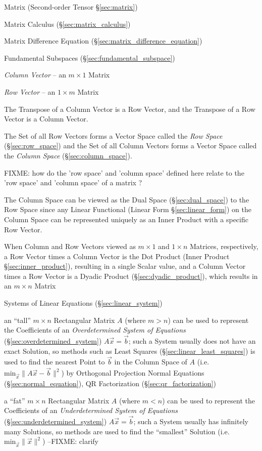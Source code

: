 \fist Matrix (Second-order Tensor \S\ref{sec:matrix})

\fist Matrix Calculus (\S\ref{sec:matrix_calculus})

\fist Matrix Difference Equation (\S\ref{sec:matrix_difference_equation})

\fist Fundamental Subspaces (\S\ref{sec:fundamental_subspace})

\emph{Column Vector} -- an $m \times 1$ Matrix

\emph{Row Vector} -- an $1 \times m$ Matrix

The Transpose of a Column Vector is a Row Vector, and the Transpose of a Row
Vector is a Column Vector.

The Set of all Row Vectors forms a Vector Space called the \emph{Row Space}
(\S\ref{sec:row_space}) and the Set of all Column Vectors forms a Vector Space
called the \emph{Column Space} (\S\ref{sec:column_space}).

FIXME: how do the 'row space' and 'column space' defined here relate to the
'row space' and 'column space' of a matrix ?

The Column Space can be viewed as the Dual Space (\S\ref{sec:dual_space}) to
the Row Space since any Linear Functional (Linear Form \S\ref{sec:linear_form})
on the Column Space can be represented uniquely as an Inner Product with a
specific Row Vector.

When Column and Row Vectors viewed as $m \times 1$ and $1 \times n$ Matrices,
respectively, a Row Vector times a Column Vector is the Dot Product
(Inner Product \S\ref{sec:inner_product}), resulting in a single Scalar value,
and a Column Vector times a Row Vector is a Dyadic Product
(\S\ref{sec:dyadic_product}), which results in an $m \times n$ Matrix


Systems of Linear Equations (\S\ref{sec:linear_system})

an ``tall'' $m \times n$ Rectangular Matrix $A$ (where $m > n$) can be used to
represent the Coefficients of an \emph{Overdetermined System of Equations}
(\S\ref{sec:overdetermined_system}) $A\vec{x} = \vec{b}$; such a System usually
does not have an exact Solution, so methods such as Least Squares
(\S\ref{sec:linear_least_squares}) is used to find the nearest Point to
$\vec{b}$ in the Column Space of $A$ (i.e.  $\mathrm{min}_{\vec{x}} \|A\vec{x} -
\vec{b}\|^2$) by Orthogonal Projection \fist Normal Equations
(\S\ref{sec:normal_equation}), QR Factorization (\S\ref{sec:qr_factorization})

a ``fat'' $m \times n$ Rectangular Matrix $A$ (where $m < n$) can be used to
represent the Coefficients of an \emph{Underdetermined System of Equations}
(\S\ref{sec:underdetermined_system}) $A\vec{x} = \vec{b}$; such a System
usually has infinitely many Solutions, so methods are used to find the
``smallest'' Solution (i.e. $\mathrm{min}_{\vec{x}} \|\vec{x}\|^2$)
--FIXME: clarify


